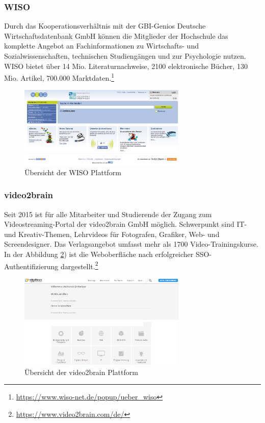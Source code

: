 \subsubsection{WISO}
Durch das Kooperationsverhältnis mit der GBI-Genios Deutsche Wirtschaftsdatenbank GmbH können die Mitglieder der Hochschule das komplette Angebot an Fachinformationen zu Wirtschafts- und Sozialwissenschaften, technischen Studiengängen und zur Psychologie  nutzen. WISO bietet über 14 Mio. Literaturnachweise, 2100 elektronische Bücher, 130 Mio. Artikel, 700.000 Marktdaten.\footnote{\url{https://www.wiso-net.de/popup/ueber_wiso}}

\begin{figure}[h!]
	\centering
	\includegraphics[width=8cm]{kapitel/gruppe2/bilder/wiso_plattform.png}
	\caption{Übersicht der WISO Plattform}
	\label{fig_wiso_plattform.png}
\end{figure}

\subsubsection{video2brain}
Seit 2015 ist für alle Mitarbeiter und Studierende der Zugang zum Videostreaming-Portal der video2brain GmbH möglich. Schwerpunkt sind IT- und Kreativ-Themen, Lehrvideos für Fotografen, Grafiker, Web- und Screendesigner. Das Verlagsangebot umfasst mehr als 1700 Video-Trainingskurse. In der Abbildung \ref{fig_video2brain_suchergebnis}) ist die Weboberfläche nach erfolgreicher SSO-Authentifizierung dargestellt.\footnote{\url{https://www.video2brain.com/de/}}

\begin{figure}[h!]
	\centering
	\includegraphics[width=8cm]{kapitel/gruppe2/bilder/video2brain_suche}
	\caption{Übersicht der video2brain Plattform}
	\label{fig_video2brain_suchergebnis}
\end{figure}

